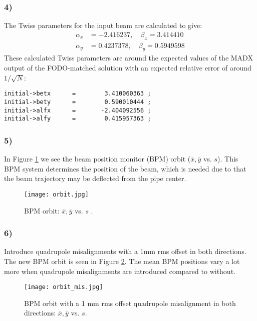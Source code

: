 \documentclass[12pt,a4paper,english]{article}
\begin{document}
\subsubsection*{4)}
The Twiss parameters for the input beam are calculated to give:
\begin{align*}
\alpha_x&=-2.416237,\quad \beta_x=3.414410\\
\alpha_y&=0.4237378,\quad \beta_y=0.5949598
\end{align*}
These calculated Twiss parameters are around the expected values of the MADX output of the FODO-matched solution with an expected relative error of around $1/\sqrt{N}$:
\begin{lstlisting}
initial->betx      =        3.410060363 ;
initial->bety      =        0.590010444 ;
initial->alfx      =       -2.404092556 ;
initial->alfy      =        0.415957363 ;
\end{lstlisting}

\subsubsection*{5)}
In Figure \ref{fig:beam_orbit} we see the beam position monitor (BPM) orbit ($\overline{x},\overline{y}$ vs. $s$). This BPM system determines the position of the beam, which is needed due to that the beam trajectory may be deflected from the pipe center.

\begin{figure}[htbp!]
	\centering\texttt{[image: orbit.jpg]}
	\caption{BPM orbit: $\overline{x},\overline{y}$ vs. $s$ . \label{fig:beam_orbit}}
\end{figure} 

\subsubsection*{6)}
Introduce quadrupole misalignments with a 1mm rms offset in both directions. The new BPM orbit is seen in Figure \ref{fig:mis_beam_orbit}. The mean BPM positions vary a lot more when quadrupole misalignments are introduced compared to without.

\begin{figure}[htbp!]
	\centering\texttt{[image: orbit\_mis.jpg]}
	\caption{BPM orbit with a 1 mm rms offset quadrupole misalignment in both directions: $\overline{x},\overline{y}$ vs. $s$. \label{fig:mis_beam_orbit}}
\end{figure} 
\end{document}

